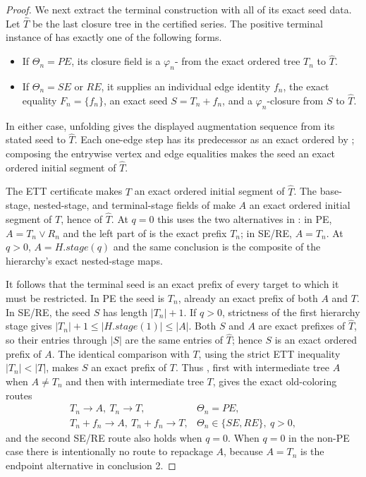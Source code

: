 \begin{proof}
We next extract the terminal construction with all of its exact seed
data.  Let $\widehat T$ be the last closure tree in the certified series.
The positive terminal instance of  has
exactly one of the following forms.
\begin{itemize}
\item If $\Theta_n=PE$, its closure field is a
$\varphi_n$- from the exact ordered tree $T_n$
to $\widehat T$.
\item If $\Theta_n=SE$ or $RE$, it supplies an individual edge identity
$f_n$, the exact equality $F_n=\{f_n\}$, an exact
 seed $S=T_n+f_n$, and a
$\varphi_n$-closure from $S$ to $\widehat T$.
\end{itemize}
In either case, unfolding  gives the displayed
augmentation sequence from its stated seed to $\widehat T$.  Each
one-edge step has its predecessor as an exact ordered
 by
; composing the entrywise vertex and edge
equalities makes the seed an exact ordered initial segment of
$\widehat T$.

The ETT certificate makes $T$ an exact ordered initial segment of
$\widehat T$.  The base-stage, nested-stage, and terminal-stage fields of
 make $A$ an exact ordered initial segment of
$T$, hence of $\widehat T$.  At $q=0$ this uses the two alternatives in
: in PE, $A=T_n\vee R_n$ and the left part of
 is the exact prefix $T_n$; in SE/RE,
$A=T_n$.  At $q>0$, $A=H.\mathit{stage}(q)$ and the same conclusion is
the composite of the hierarchy's exact nested-stage maps.

It follows that the terminal seed is an exact prefix of every target to
which it must be restricted.  In PE the seed is $T_n$, already an exact
prefix of both $A$ and $T$.  In SE/RE, the seed $S$ has length
$|T_n|+1$.  If $q>0$, strictness of the first hierarchy stage gives
$|T_n|+1\leq |H.\mathit{stage}(1)|\leq |A|$.  Both $S$ and $A$ are exact
prefixes of $\widehat T$, so their entries through $|S|$ are the same
entries of $\widehat T$; hence $S$ is an exact ordered prefix of $A$.
The identical comparison with $T$, using the strict ETT inequality
$|T_n|<|T|$, makes $S$ an exact prefix of $T$.  Thus
, first with intermediate
tree $A$ when $A\ne T_n$ and then with intermediate tree $T$, gives the
exact old-coloring routes
\[
 \begin{array}{ll}
 T_n\longrightarrow A,\ T_n\longrightarrow T,&\Theta_n=PE,\\
 T_n+f_n\longrightarrow A,\ T_n+f_n\longrightarrow T,
     &\Theta_n\in\{SE,RE\},\ q>0,
 \end{array}                                                    \tag{9}
\]
and the second SE/RE route also holds when $q=0$.  When $q=0$ in the
non-PE case there is intentionally no route to repackage $A$, because
$A=T_n$ is the endpoint alternative in conclusion 2.


\end{proof}
